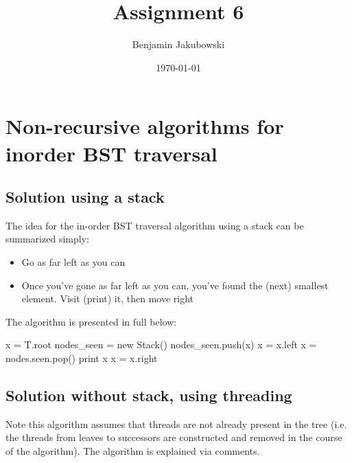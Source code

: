 \documentclass[paper=a4, fontsize=11pt]{scrartcl} %
\title{	Assignment 6}
\author{Benjamin Jakubowski} %
\date{\normalsize\today} %
\numberwithin{equation}{section} %
\numberwithin{figure}{section} %
\numberwithin{table}{section} %
\begin{document}
\maketitle %

\section{Non-recursive algorithms for inorder BST traversal}

\subsection{Solution using a stack}

The idea for the in-order BST traversal algorithm using a stack can be summarized simply:
\begin{itemize}
\item Go as far left as you can
\item Once you've gone as far left as you can, you've found the (next) smallest element. Visit (print) it, then move right
\end{itemize}

The algorithm is presented in full below:

\begin{algorithmic}
	\State x = T.root
	\State nodes\_seen = new Stack()
			\State nodes\_seen.push(x)
			\State x = x.left
		\Else
			\State x = nodes.seen.pop()
			\State print x
			\State x = x.right
		\EndIf
	\EndWhile
\EndFunction
\end{algorithmic}

\subsection{Solution without stack, using threading}

Note this algorithm assumes that threads are not already present in the tree (i.e. the threads from leaves to successors are constructed and removed in the course of the algorithm). The algorithm is explained via comments.\\
\end{document}
